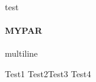 \documentclass{book}
\newcommand{\donothing}[1]{#1}
\newcommand{\cmd}[1]{#1}
\newcommand{\mypar}{\paragraph{MYPAR}}
\begin{document}
\donothing{test}
\mypar
\blindtext

\donothing{

multiline

}


\cmd{Test1}
\cmd{Test2}\cmd{Test3}
\cmd{Test4}
\end{document}
